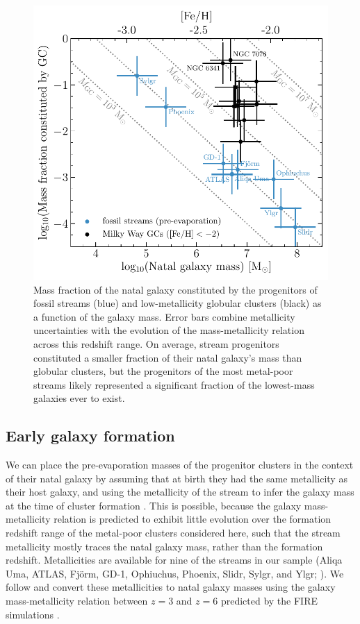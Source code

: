 \documentclass[twocolumn]{aastex63}
\begin{document}
\begin{figure}
\includegraphics[width=\hsize]{figures/mhost_fraction.pdf}
\caption{
\label{fig:mhost}
Mass fraction of the natal galaxy constituted by the progenitors of fossil streams (blue) and low-metallicity globular clusters (black) as a function of the galaxy mass.
Error bars combine metallicity uncertainties with the evolution of the mass-metallicity relation across this redshift range.
On average, stream progenitors constituted a smaller fraction of their natal galaxy's mass than globular clusters, but the progenitors of the most metal-poor streams likely represented a significant fraction of the lowest-mass galaxies ever to exist.
}
\end{figure}

\subsection{Early galaxy formation}
\label{sec:discuss_galform}
We can place the pre-evaporation masses of the progenitor clusters in the context of their natal galaxy by assuming that at birth they had the same metallicity as their host galaxy, and using the metallicity of the stream to infer the galaxy mass at the time of cluster formation \citep{kruijssen20b}. This is possible, because the galaxy mass-metallicity relation is predicted to exhibit little evolution over the formation redshift range of the metal-poor clusters considered here, such that the stream metallicity mostly traces the natal galaxy mass, rather than the formation redshift. Metallicities are available for nine of the streams in our sample (Aliqa Uma, ATLAS, Fj\"orm, GD-1, Ophiuchus, Phoenix, Slidr, Sylgr, and Ylgr; \citealt{ibata:2019,li:2020,wan20}). We follow \citet{kruijssen19c} and convert these metallicities to natal galaxy masses using the galaxy mass-metallicity relation between $z=3$ and $z=6$ predicted by the FIRE simulations \citep{ma16}.
\end{document}

